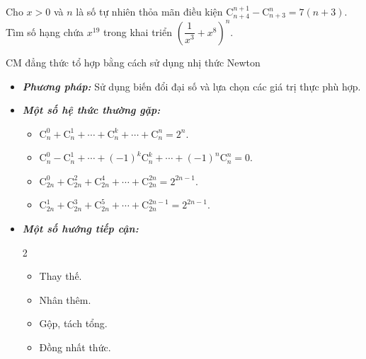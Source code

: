 \begin{vd}%
	Cho $x>0$ và $n$ là số tự nhiên thỏa mãn điều kiện $\mathrm{C}_{n+4}^{n+1}-\mathrm{C}_{n+3}^n=7(n+3)$. Tìm số hạng chứa $x^{19}$ trong khai triển $\left(\dfrac{1}{x^3}+x^8\right)^n$.
\end{vd}
\begin{dang}{CM đẳng thức tổ hợp bằng cách sử dụng nhị thức Newton}
	\begin{itemize}
		\item \textbf{\textit{Phương pháp: }} Sử dụng biến đổi đại số và lựa chọn các giá trị thực phù hợp.
		\item \textbf{\textit{Một số hệ thức thường gặp:}}
		\begin{itemize}
			\item $\mathrm{C}_n^0+\mathrm{C}_n^1+\cdots+\mathrm{C}_n^k+\cdots+\mathrm{C}_n^n=2^n$.
			\item $\mathrm{C}_n^0-\mathrm{C}_n^1+\cdots+(-1)^k\mathrm{C}_n^k+\cdots+(-1)^n\mathrm{C}_n^n=0$.
			\item $\mathrm{C}_{2n}^0+\mathrm{C}_{2n}^2+\mathrm{C}_{2n}^4+\cdots+\mathrm{C}_{2n}^{2n}=2^{2n-1}$.
			\item $\mathrm{C}_{2n}^1+\mathrm{C}_{2n}^3+\mathrm{C}_{2n}^5+\cdots+\mathrm{C}_{2n}^{2n-1}=2^{2n-1}$.
		\end{itemize}
		\item \textbf{\textit{Một số hướng tiếp cận:}}
		\begin{multicols}{2}
			\begin{itemize}
				\item Thay thế.
				\item Nhân thêm.
				\item Gộp, tách tổng.
				\item Đồng nhất thức.
			\end{itemize}
		\end{multicols}
	\end{itemize}
\end{dang}
